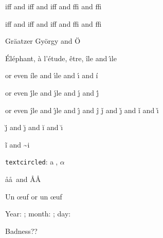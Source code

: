 \documentclass[12pt]{article}
\newcommand{\bsl}{\texttt{\symbol{92}}}
\newcommand{\tc}{\textcircled}
\begin{document}
    iff and if\textcompwordmark f and iff and ffi and ff\textcompwordmark i

    iff and if{f} and iff and ffi and ff{i}

    Gr\"{aa}tzer Gy\"orgy and \"O

    \'El\'ephant, \`a l'\'etude, \^etre, \^ile and \^\i{}le

    or even \'ile and \'\i{}le and \'{\i} and \'{i}

    or even \'jle and \'\j{}le and \'{\j} and \'{j}

    or even \^jle and \^\j{}le and \^{\j} and \^{j}
    \v{j} and \v{\j} and \v{i} and \v{\i}

    \u j and \u{\j} and \u i and \u{\i}

    \~i and \~{}i

    \bsl\texttt{textcircled}: \textcircled{a}, \tc{$\alpha$}

    \r a\aa\ and \AA \r A

    Un \oe uf or un \oe{}uf

    Year: \the\year; month: \the\month; day: \the\day

    Badness?? \the\badness
\end{document}
